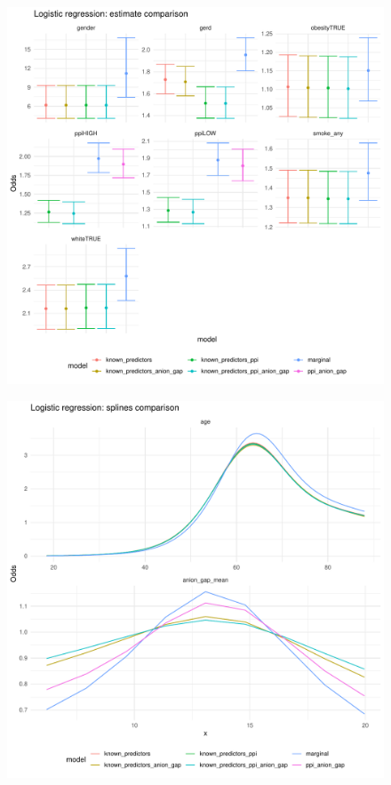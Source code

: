 \documentclass[english]{article}
\begin{document}
\begin{figure}[h]
\centering
\includegraphics[width=\linewidth]{labs/logreg_coefs.pdf}
\end{figure}

\begin{figure}[h]
\centering
\includegraphics[width=\linewidth]{labs/logreg_splines.pdf}
\end{figure}
\end{document}

